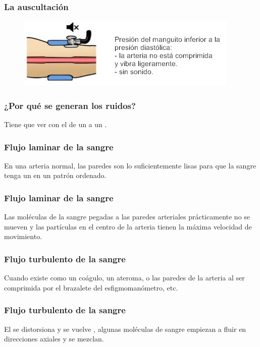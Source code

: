 \documentclass[14pt]{beamer}
\begin{document}
\begin{frame}
\frametitle{La auscultación}
\vspace*{-1cm}
\begin{figure}
    \centering
    \includegraphics[scale=2]{Imagenes/Esfigmomanometro_05.jpg}
\end{figure}
\end{frame}
\begin{frame}
\frametitle{¿Por qué se generan los ruidos?}
Tiene que ver con el  de un  a un .
\end{frame}
\begin{frame}
\frametitle{Flujo laminar de la sangre}
En una arteria normal, las paredes son lo suficientemente lisas para que la sangre tenga un  en un patrón ordenado.
\end{frame}
\begin{frame}
\frametitle{Flujo laminar de la sangre}
Las moléculas de la sangre pegadas a las paredes arteriales prácticamente no se mueven y las partículas en el centro de la arteria tienen la máxima velocidad de movimiento.
\end{frame}
\begin{frame}
\frametitle{Flujo turbulento de la sangre}
Cuando existe  como un coágulo, un ateroma, o las paredes de la
arteria al ser comprimida por el brazalete del esfigmomanómetro, etc.
\end{frame}
\begin{frame}
\frametitle{Flujo turbulento de la sangre}
El  se distorsiona y se vuelve , \pause  algunas moléculas de sangre empiezan a fluir en direcciones axiales y se mezclan.
\end{frame}
\end{document}
